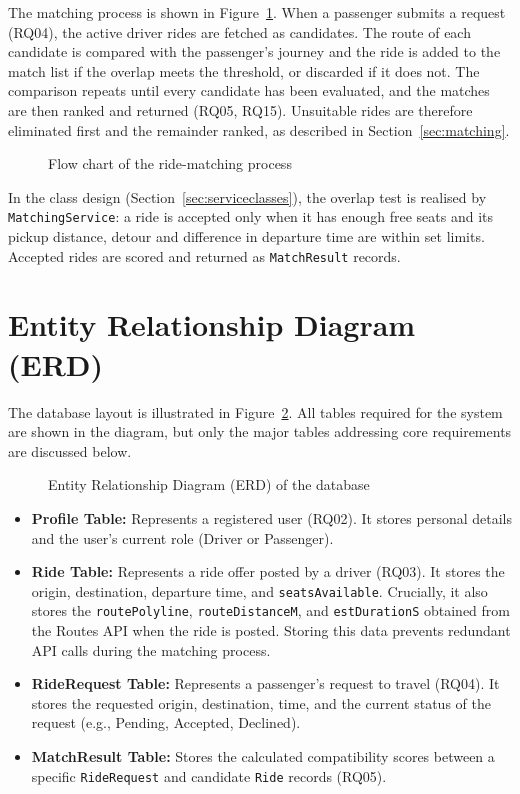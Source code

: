 The matching process is shown in Figure~\ref{fig:matching}. When a passenger submits a request (RQ04), the active driver rides are fetched as candidates. The route of each candidate is compared with the passenger's journey \citep{hong2017} and the ride is added to the match list if the overlap meets the threshold, or discarded if it does not. The comparison repeats until every candidate has been evaluated, and the matches are then ranked and returned (RQ05, RQ15). Unsuitable rides are therefore eliminated first and the remainder ranked, as described in Section~\ref{sec:matching}.

\begin{figure}[htbp]
  \centering
  \caption{Flow chart of the ride-matching process}
  \label{fig:matching}
\end{figure}

In the class design (Section~\ref{sec:serviceclasses}), the overlap test is realised by \texttt{MatchingService}: a ride is accepted only when it has enough free seats and its pickup distance, detour and difference in departure time are within set limits. Accepted rides are scored and returned as \texttt{MatchResult} records.

\section{Entity Relationship Diagram (ERD)}

The database layout is illustrated in Figure~\ref{fig:erd}. All tables required for the system are shown in the diagram, but only the major tables addressing core requirements are discussed below.

\begin{figure}[htbp]
  \centering
  \caption{Entity Relationship Diagram (ERD) of the database}
  \label{fig:erd}
\end{figure}

\begin{itemize}
  \item \textbf{Profile Table:} Represents a registered user (RQ02). It stores personal details and the user's current role (Driver or Passenger).
  \item \textbf{Ride Table:} Represents a ride offer posted by a driver (RQ03). It stores the origin, destination, departure time, and \texttt{seatsAvailable}. Crucially, it also stores the \texttt{routePolyline}, \texttt{routeDistanceM}, and \texttt{estDurationS} obtained from the Routes API when the ride is posted. Storing this data prevents redundant API calls during the matching process.
  \item \textbf{RideRequest Table:} Represents a passenger's request to travel (RQ04). It stores the requested origin, destination, time, and the current status of the request (e.g., Pending, Accepted, Declined).
  \item \textbf{MatchResult Table:} Stores the calculated compatibility scores between a specific \texttt{RideRequest} and candidate \texttt{Ride} records (RQ05).
\end{itemize}

